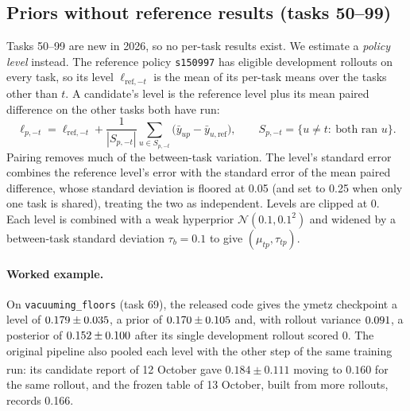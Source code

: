 \documentclass[10pt]{article}
\newcommand{\code}[1]{\texttt{#1}}
\newcommand{\pl}{\textsuperscript{\dag}}
\begin{document}
\subsection{Priors without reference results (tasks 50--99)}
Tasks 50--99 are new in 2026, so no per-task results exist. We estimate a \emph{policy level} instead. The reference policy \code{s150997} has eligible development rollouts on every task, so its level $\ell_{\mathrm{ref},-t}$ is the mean of its per-task means over the tasks other than $t$. A candidate's level is the reference level plus its mean paired difference on the other tasks both have run:
\begin{equation}
\ell_{p,-t}=\ell_{\mathrm{ref},-t}+\frac{1}{|S_{p,-t}|}\sum_{u\in S_{p,-t}}\big(\bar y_{up}-\bar y_{u,\mathrm{ref}}\big),\qquad S_{p,-t}=\{u\neq t:\ \text{both ran }u\}.
\end{equation}
Pairing removes much of the between-task variation. The level's standard error combines the reference level's error with the standard error of the mean paired difference, whose standard deviation is floored at 0.05 (and set to 0.25 when only one task is shared), treating the two as independent. Levels are clipped at 0. Each level is combined with a weak hyperprior $\mathcal N(0.1,0.1^2)$ and widened by a between-task standard deviation $\tau_b=0.1$ to give $(\mu_{tp},\tau_{tp})$.

\paragraph{Worked example.} On \code{vacuuming\_floors} (task 69), the released code gives the ymetz checkpoint a level of $0.179\pm0.035$, a prior of $0.170\pm0.105$ and, with rollout variance $0.091$, a posterior of $0.152\pm0.100$ after its single development rollout scored 0. The original pipeline also pooled each level with the other step of the same training run: its candidate report of 12 October gave $0.184\pm0.111$ moving to $0.160$\pl{} for the same rollout, and the frozen table of 13 October, built from more rollouts, records 0.166.
\end{document}

